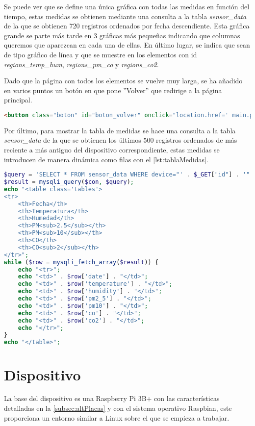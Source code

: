 Se puede ver que se define una única gráfica con todas las medidas en función del tiempo, estas medidas se obtienen mediante una consulta a la tabla \textit{sensor\_data} de la que se obtienen 720 registros ordenados por fecha descendiente. Esta gráfica grande se parte más tarde en 3 gráficas más pequeñas indicando que columnas queremos que aparezcan en cada una de ellas. En último lugar, se indica que sean de tipo gráfico de línea y que se muestre en los elementos con id \textit{regions\_temp\_hum}, \textit{regions\_pm\_co} y \textit{regions\_co2}.

Dado que la página con todos los elementos se vuelve muy larga, se ha añadido en varios puntos un botón en que pone ''Volver'' que redirige a la página principal.
\begin{lstlisting}[language=HTML, caption=Botón de retorno a página principal, label=lst:botonVolver]
<button class="boton" id="boton_volver" onclick="location.href=' main.php'">Volver</button>
\end{lstlisting}

Por último, para mostrar la tabla de medidas se hace una consulta a la tabla \textit{sensor\_data} de la que se obtienen los últimos 500 registros ordenados de más reciente a más antiguo del dispositivo correspondiente, estas medidas se introducen de manera dinámica como filas con el \autoref{lst:tablaMedidas}.
\begin{lstlisting}[language=PHP, caption=Visualización tabular de las medidas del dispositivo, label=lst:tablaMedidas]
$query = 'SELECT * FROM sensor_data WHERE device="' . $_GET["id"] . '" ORDER BY date DESC LIMIT 500';
$result = mysqli_query($con, $query);
echo "<table class='tables'>
<tr>
    <th>Fecha</th>
    <th>Temperatura</th>
    <th>Humedad</th>
    <th>PM<sub>2.5</sub></th>
    <th>PM<sub>10</sub></th>
    <th>CO</th>
    <th>CO<sub>2</sub></th>
</tr>";
while ($row = mysqli_fetch_array($result)) {
    echo "<tr>";
    echo "<td>" . $row['date'] . "</td>";
    echo "<td>" . $row['temperature'] . "</td>";
    echo "<td>" . $row['humidity'] . "</td>";
    echo "<td>" . $row['pm2_5'] . "</td>";
    echo "<td>" . $row['pm10'] . "</td>";
    echo "<td>" . $row['co'] . "</td>";
    echo "<td>" . $row['co2'] . "</td>";
    echo "</tr>";
}
echo "</table>";
\end{lstlisting}

\section{Dispositivo}\label{sec:implDispositivo}
La base del dispositivo es una Raspberry Pi 3B+ con las características detalladas en la \autoref{subsec:altPlacas} y con el sistema operativo Raspbian, este proporciona un entorno similar a Linux sobre el que se empieza a trabajar.

